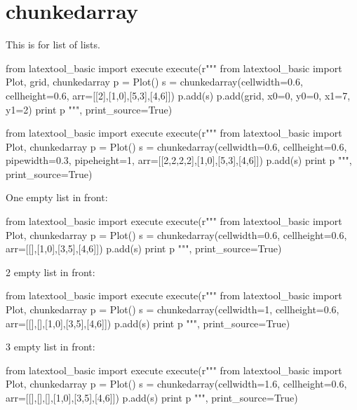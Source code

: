 \section{chunkedarray}

This is for list of lists.

\begin{python}
from latextool_basic import execute
execute(r"""
from latextool_basic import Plot, grid, chunkedarray
p = Plot()
s = chunkedarray(cellwidth=0.6,
                 cellheight=0.6,
                 arr=[[2],[1,0],[5,3],[4,6]])
p.add(s)
p.add(grid, x0=0, y0=0, x1=7, y1=2)
print p
""", print_source=True)
\end{python}

\begin{python}
from latextool_basic import execute
execute(r"""
from latextool_basic import Plot, chunkedarray
p = Plot()
s = chunkedarray(cellwidth=0.6,
                 cellheight=0.6,
                 pipewidth=0.3,
                 pipeheight=1,
                 arr=[[2,2,2,2],[1,0],[5,3],[4,6]])
p.add(s)
print p
""", print_source=True)
\end{python}



One empty list in front:
\begin{python}
from latextool_basic import execute
execute(r"""
from latextool_basic import Plot, chunkedarray
p = Plot()
s = chunkedarray(cellwidth=0.6,
                 cellheight=0.6,
                   arr=[[],[1,0],[3,5],[4,6]])
p.add(s)
print p
""", print_source=True)
\end{python}



2 empty list in front:
\begin{python}
from latextool_basic import execute
execute(r"""
from latextool_basic import Plot, chunkedarray
p = Plot()
s = chunkedarray(cellwidth=1,
                 cellheight=0.6,
                   arr=[[],[],[1,0],[3,5],[4,6]])
p.add(s)
print p
""", print_source=True)
\end{python}




3 empty list in front:
\begin{python}
from latextool_basic import execute
execute(r"""
from latextool_basic import Plot, chunkedarray
p = Plot()
s = chunkedarray(cellwidth=1.6,
                 cellheight=0.6,
                 arr=[[],[],[],[1,0],[3,5],[4,6]])
p.add(s)
print p
""", print_source=True)
\end{python}




